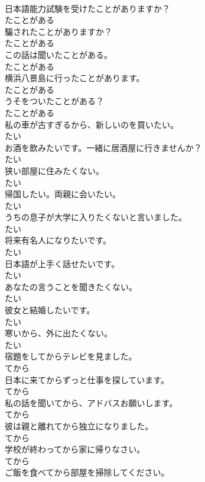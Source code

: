 \documentclass[8pt]{extreport}
\begin{document}
\begin{CJK}{UTF8}{min}
\\	日本語能力試験を受けたことがありますか？	
\\	たことがある	
\\	騙されたことがありますか？	
\\	たことがある	
\\	この話は聞いたことがある。	
\\	たことがある	
\\	横浜八景島に行ったことがあります。	
\\	たことがある	
\\	うそをついたことがある？	
\\	たことがある	
\\	私の車が古すぎるから、新しいのを買いたい。	
\\	たい	
\\	お酒を飲みたいです。一緒に居酒屋に行きませんか？	
\\	たい	
\\	狭い部屋に住みたくない。	
\\	たい	
\\	帰国したい。両親に会いたい。	
\\	たい	
\\	うちの息子が大学に入りたくないと言いました。	
\\	たい	
\\	将来有名人になりたいです。	
\\	たい	
\\	日本語が上手く話せたいです。	
\\	たい	
\\	あなたの言うことを聞きたくない。	
\\	たい	
\\	彼女と結婚したいです。	
\\	たい	
\\	寒いから、外に出たくない。	
\\	たい	
\\	宿題をしてからテレビを見ました。	
\\	てから	
\\	日本に来てからずっと仕事を探しています。	
\\	てから	
\\	私の話を聞いてから、アドバスお願いします。	
\\	てから	
\\	彼は親と離れてから独立になりました。	
\\	てから	
\\	学校が終わってから家に帰りなさい。	
\\	てから	
\\	ご飯を食べてから部屋を掃除してください。	

\end{CJK}
\end{document}

